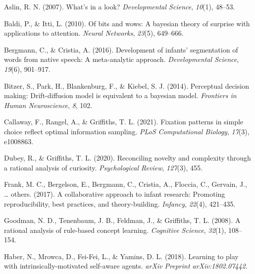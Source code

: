 \documentclass[10pt, letterpaper]{article}
\newenvironment{CSLReferences}%
  {}%
  {\par}
\begin{document}
\hypertarget{refs}{}
\begin{CSLReferences}{1}{0}
\leavevmode{}%
Aslin, R. N. (2007). What's in a look? \emph{Developmental Science},
\emph{10}(1), 48--53.

\leavevmode{}%
Baldi, P., \& Itti, L. (2010). Of bits and wows: A bayesian theory of
surprise with applications to attention. \emph{Neural Networks},
\emph{23}(5), 649--666.

\leavevmode{}%
Bergmann, C., \& Cristia, A. (2016). Development of infants'
segmentation of words from native speech: A meta-analytic approach.
\emph{Developmental Science}, \emph{19}(6), 901--917.

\leavevmode{}%
Bitzer, S., Park, H., Blankenburg, F., \& Kiebel, S. J. (2014).
Perceptual decision making: Drift-diffusion model is equivalent to a
bayesian model. \emph{Frontiers in Human Neuroscience}, \emph{8}, 102.

\leavevmode{}%
Callaway, F., Rangel, A., \& Griffiths, T. L. (2021). Fixation patterns
in simple choice reflect optimal information sampling. \emph{PLoS
Computational Biology}, \emph{17}(3), e1008863.

\leavevmode{}%
Dubey, R., \& Griffiths, T. L. (2020). Reconciling novelty and
complexity through a rational analysis of curiosity. \emph{Psychological
Review}, \emph{127}(3), 455.

\leavevmode{}%
Frank, M. C., Bergelson, E., Bergmann, C., Cristia, A., Floccia, C.,
Gervain, J., \ldots{} others. (2017). A collaborative approach to infant
research: Promoting reproducibility, best practices, and
theory-building. \emph{Infancy}, \emph{22}(4), 421--435.

\leavevmode{}%
Goodman, N. D., Tenenbaum, J. B., Feldman, J., \& Griffiths, T. L.
(2008). A rational analysis of rule-based concept learning.
\emph{Cognitive Science}, \emph{32}(1), 108--154.

\leavevmode{}%
Haber, N., Mrowca, D., Fei-Fei, L., \& Yamins, D. L. (2018). Learning to
play with intrinsically-motivated self-aware agents. \emph{arXiv
Preprint arXiv:1802.07442}.


\end{CSLReferences}
\end{document}
